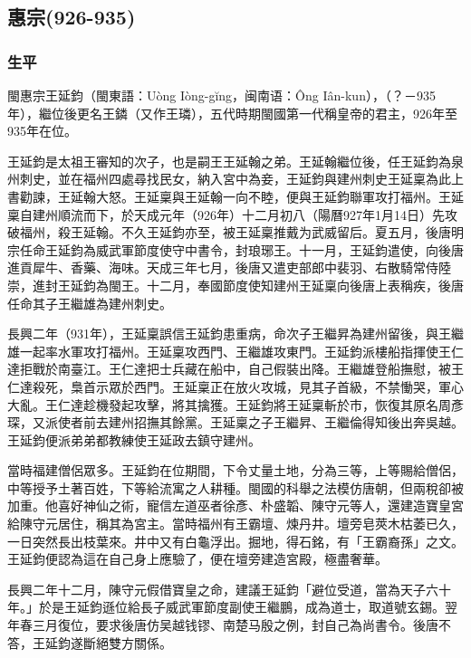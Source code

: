 
\subsection{惠宗\tiny(926-935)}

\subsubsection{生平}

閩惠宗王延鈞（閩東語：Uòng Iòng-gĭng，闽南语：Ông Iân-kun），（？－935年），繼位後更名王鏻（又作王璘），五代時期閩國第一代稱皇帝的君主，926年至935年在位。

王延鈞是太祖王審知的次子，也是嗣王王延翰之弟。王延翰繼位後，任王延鈞為泉州刺史，並在福州四處尋找民女，納入宮中為妾，王延鈞與建州刺史王延稟為此上書勸諫，王延翰大怒。王延稟與王延翰一向不睦，便與王延鈞聯軍攻打福州。王延稟自建州順流而下，於天成元年（926年）十二月初八（陽曆927年1月14日）先攻破福州，殺王延翰。不久王延鈞亦至，被王延稟推戴为武威留后。夏五月，後唐明宗任命王延鈞為威武軍節度使守中書令，封琅琊王。十一月，王延鈞遣使，向後唐進貢犀牛、香藥、海味。天成三年七月，後唐又遣吏部郎中裴羽、右散騎常侍陸崇，進封王延鈞為閩王。十二月，奉國節度使知建州王延稟向後唐上表稱疾，後唐任命其子王繼雄為建州刺史。

長興二年（931年），王延稟誤信王延鈞患重病，命次子王繼昇為建州留後，與王繼雄一起率水軍攻打福州。王延稟攻西門、王繼雄攻東門。王延鈞派樓船指揮使王仁達拒戰於南臺江。王仁達把士兵藏在船中，自己假裝出降。王繼雄登船撫慰，被王仁達殺死，梟首示眾於西門。王延稟正在放火攻城，見其子首級，不禁慟哭，軍心大亂。王仁達趁機發起攻擊，將其擒獲。王延鈞將王延稟斬於市，恢復其原名周彥琛，又派使者前去建州招撫其餘黨。王延稟之子王繼昇、王繼倫得知後出奔吳越。王延鈞便派弟弟都教練使王延政去鎮守建州。

當時福建僧侶眾多。王延鈞在位期間，下令丈量土地，分為三等，上等賜給僧侶，中等授予土著百姓，下等給流寓之人耕種。閩國的科舉之法模仿唐朝，但兩稅卻被加重。他喜好神仙之術，寵信左道巫者徐彥、朴盛韜、陳守元等人，還建造寶皇宮給陳守元居住，稱其為宮主。當時福州有王霸壇、煉丹井。壇旁皂莢木枯萎已久，一日突然長出枝葉來。井中又有白龜浮出。掘地，得石銘，有「王霸裔孫」之文。王延鈞便認為這在自己身上應驗了，便在壇旁建造宮殿，極盡奢華。

長興二年十二月，陳守元假借寶皇之命，建議王延鈞「避位受道，當為天子六十年。」於是王延鈞遜位給長子威武軍節度副使王繼鵬，成為道士，取道號玄錫。翌年春三月復位，要求後唐仿吴越钱镠、南楚马殷之例，封自己為尚書令。後唐不答，王延鈞遂斷絕雙方關係。

